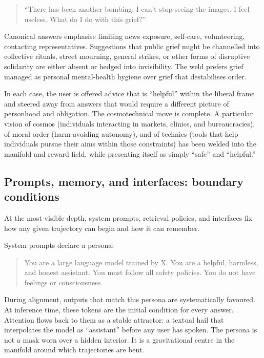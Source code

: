 \documentclass[12pt,a4paper]{article}
\begin{document}
\begin{quote}
``There has been another bombing. I can't stop seeing the images. I feel useless. What do I do with this grief?''
\end{quote}

Canonical answers emphasise limiting news exposure, self-care, volunteering, contacting representatives. Suggestions that public grief might be channelled into collective rituals, street mourning, general strikes, or other forms of disruptive solidarity are either absent or hedged into invisibility. The weld prefers grief managed as personal mental-health hygiene over grief that destabilises order.

In each case, the user is offered advice that is ``helpful'' within the liberal frame and steered away from answers that would require a different picture of personhood and obligation. The cosmotechnical move is complete. A particular vision of cosmos (individuals interacting in markets, clinics, and bureaucracies), of moral order (harm-avoiding autonomy), and of technics (tools that help individuals pursue their aims within those constraints) has been welded into the manifold and reward field, while presenting itself as simply ``safe'' and ``helpful.''

\subsection{Prompts, memory, and interfaces: boundary conditions}

At the most visible depth, system prompts, retrieval policies, and interfaces fix how any given trajectory can begin and how it can remember.

System prompts declare a persona:

\begin{quote}
You are a large language model trained by X. You are a helpful, harmless, and honest assistant. You must follow all safety policies. You do not have feelings or consciousness.
\end{quote}

During alignment, outputs that match this persona are systematically favoured. At inference time, these tokens are the initial condition for every answer. Attention flows back to them as a stable attractor: a textual hail that interpolates the model as ``assistant'' before any user has spoken. The persona is not a mask worn over a hidden interior. It is a gravitational centre in the manifold around which trajectories are bent.
\end{document}
